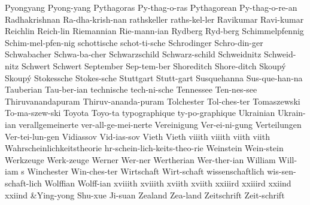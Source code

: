 \1 Pyongyang		Pyong-yang		%
\1 Pythagoras		Py-thag-o-ras		%
\1 Pythagorean		Py-thag-o-re-an		%
\1 Radhakrishnan	Ra-dha-krish-nan   %
\1 rathskeller		raths-kel-ler
\1 Ravikumar		Ravi-kumar		%
\1 Reichlin		Reich-lin		%
\1 Riemannian		Rie-mann-ian
\1 Rydberg		Ryd-berg
\1 Schimmelpfennig	Schim-mel-pfen-nig	%
\1 schottische		schot-ti-sche
\1 Schrodinger		Schro-din-ger
\1 Schwabacher		Schwa-ba-cher
\1 Schwarzschild	Schwarz-schild
\1 Schweidnitz		Schweid-nitz		%
\1 Schwert		Schwert			%
\1 September		Sep-tem-ber
\1 Shoreditch		Shore-ditch		%
\1 Skoup\'y		Skoup\'y		%
\1 Stokessche		Stokes-sche
\1 Stuttgart		Stutt-gart
\1 Susquehanna		Sus-que-han-na
\1 Tauberian		Tau-ber-ian          %
\1 technische		tech-ni-sche
\1 Tennessee		Ten-nes-see
\1 Thiruvanandapuram	Thiruv-ananda-puram	%
\1 Tolchester		Tol-ches-ter		%
\1 Tomaszewski		To-ma-szew-ski		%
\1 Toyota		Toyo-ta			%
\1 typographique	ty-po-graphique      %
\1 Ukrainian		Ukrain-ian
\1 verallgemeinerte	ver-all-ge-mei-nerte
\1 Vereinigung		Ver-ei-ni-gung
\1 Verteilungen 	Ver-tei-lun-gen
\1 Vidiassov		Vid-ias-sov		%
\1 Vieth		Vieth			%
\1 viiith		viiith			%
\1 viith		viith			%
\1 Wahrscheinlichkeitstheorie  hr-schein-lich-keits-theo-rie
\1 Weinstein		Wein-stein		%
\1 Werkzeuge		Werk-zeuge		%
\1 Werner		Wer-ner		%
\1 Wertherian		Wer-ther-ian
\2 William		Will-iam s		%
\1 Winchester		Win-ches-ter
\1 Wirtschaft		Wirt-schaft		%
\1 wissenschaftlich	wis-sen-schaft-lich
\1 Wolffian		Wolff-ian		%
\1 xviiith		xviiith			%
\1 xviith		xviith			%
\1 xxiiird		xxiiird			%
\1 xxiind		xxiind			%
\tabalign {}&Ying-yong Shu-xue Ji-suan\cr
\1 Zealand		Zea-land
\1 Zeitschrift		Zeit-schrift
\endgraf
\endgroup

\bigskip
\makesignature
\endarticle
